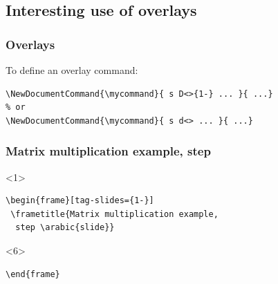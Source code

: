 \documentclass{ltx-talk}
\begin{document}
\subsection{Interesting use of overlays}

\begin{frame*}
\frametitle{Overlays}
To define an overlay command:
\begin{lstlisting}
\NewDocumentCommand{\mycommand}{ s D<>{1-} ... }{ ...}
% or
\NewDocumentCommand{\mycommand}{ s d<> ... }{ ...}
\end{lstlisting}
\end{frame*}

\begin{frame*}[tag-slides={1-}]
\lstset{aboveskip=0pt,belowskip=0pt}
\frametitle{Matrix multiplication example,
 step }
 \begin{minipage}{.52\textwidth}
 \begin{onlyenv}<1>
\begin{lstlisting}
\begin{frame}[tag-slides={1-}]
 \frametitle{Matrix multiplication example,
  step \arabic{slide}}
\end{lstlisting}
 \end{onlyenv}
 \begin{onlyenv}<6>
 \begin{lstlisting}
\end{frame}
\end{lstlisting}
\end{onlyenv}
\end{minipage}%
\begin{minipage}{.48\textwidth}

\end{minipage}
\end{frame*}
\end{document}
